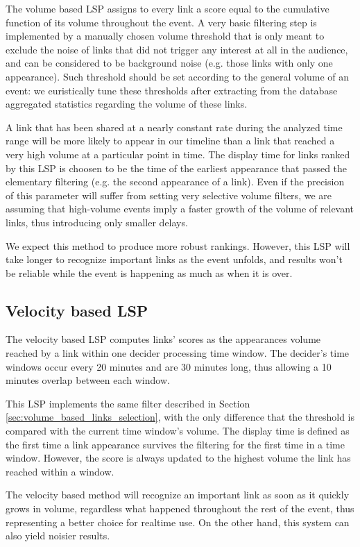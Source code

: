 \documentclass{sig-alternate}
\begin{document}
The volume based LSP assigns to every link a score equal to the cumulative function of its volume throughout the event. A very basic filtering step is implemented by a manually chosen volume threshold that is only meant to exclude the noise of links that did not trigger any interest at all in the audience, and can be considered to be background noise (e.g. those links with only one appearance). Such threshold should be set according to the general volume of an event: we euristically tune these thresholds after extracting from the database aggregated statistics regarding the volume of these links.

A link that has been shared at a nearly constant rate during the analyzed time range will be more likely to appear in our timeline than a link that reached a very high volume at a particular point in time. The display time for links ranked by this LSP is choosen to be the time of the earliest appearance that passed the elementary filtering (e.g. the second appearance of a link). Even if the precision of this parameter will suffer from setting very selective volume filters, we are assuming that high-volume events imply a faster growth of the volume of relevant links, thus introducing only smaller delays.

We expect this method to produce more robust rankings. However, this LSP will take longer to recognize important links as the event unfolds, and results won't be reliable while the event is happening as much as when it is over.

\subsection{Velocity based LSP}
\label{sec:velocity_based_links_selection}
The velocity based LSP computes links' scores as the appearances volume reached by a link within one decider processing time window. The decider's time windows occur every 20 minutes and are 30 minutes long, thus allowing a 10 minutes overlap between each window.

This LSP implements the same filter described in Section \ref{sec:volume_based_links_selection}, with the only difference that the threshold is compared with the current time window's volume. The display time is defined as the first time a link appearance survives the filtering for the first time in a time window. However, the score is always updated to the highest volume the link has reached within a window.

The velocity based method will recognize an important link as soon as it quickly grows in volume, regardless what happened throughout the rest of the event, thus representing a better choice for realtime use. On the other hand, this system can also yield noisier results.
\end{document}
